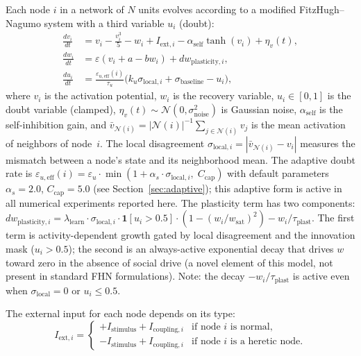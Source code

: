 \documentclass[11pt]{article}
\begin{document}
Each node $i$ in a network of $N$ units evolves according to a modified FitzHugh--Nagumo system with a third variable $u_i$ (doubt):
\begin{align}
\frac{dv_i}{dt} &= v_i - \frac{v_i^3}{5} - w_i + I_{\text{ext},i} - \alpha_{\text{self}} \tanh(v_i) + \eta_v(t), \label{eq:dv} \\
\frac{dw_i}{dt} &= \varepsilon(v_i + a - bw_i) + dw_{\text{plasticity},i}, \label{eq:dw} \\
\frac{du_i}{dt} &= \frac{\varepsilon_{u,\text{eff}}(i)}{\tau_u}\bigl(k_u \sigma_{\text{local},i} + \sigma_{\text{baseline}} - u_i\bigr), \label{eq:du}
\end{align}
where $v_i$ is the activation potential, $w_i$ is the recovery variable, $u_i \in [0, 1]$ is the doubt variable (clamped), $\eta_v(t) \sim \mathcal{N}(0, \sigma_{\text{noise}}^2)$ is Gaussian noise, $\alpha_{\text{self}}$ is the self-inhibition gain, and $\bar{v}_{\mathcal{N}(i)} = |\mathcal{N}(i)|^{-1} \sum_{j \in \mathcal{N}(i)} v_j$ is the mean activation of neighbors of node~$i$. The local disagreement $\sigma_{\text{local},i} = |\bar{v}_{\mathcal{N}(i)} - v_i|$ measures the mismatch between a node's state and its neighborhood mean. The adaptive doubt rate is $\varepsilon_{u,\text{eff}}(i) = \varepsilon_u \cdot \min(1 + \alpha_s \cdot \sigma_{\text{local},i},\; C_{\text{cap}})$ with default parameters $\alpha_s = 2.0$, $C_{\text{cap}} = 5.0$ (see Section~\ref{sec:adaptive}); this adaptive form is active in all numerical experiments reported here. The plasticity term has two components: $dw_{\text{plasticity},i} = \lambda_{\text{learn}} \cdot \sigma_{\text{local},i} \cdot \mathbf{1}[u_i > 0.5] \cdot (1 - (w_i/w_{\text{sat}})^2) - w_i/\tau_{\text{plast}}$. The first term is activity-dependent growth gated by local disagreement and the innovation mask ($u_i > 0.5$); the second is an always-active exponential decay that drives $w$ toward zero in the absence of social drive (a novel element of this model, not present in standard FHN formulations). Note: the decay $-w_i/\tau_{\text{plast}}$ is active even when $\sigma_{\text{local}} = 0$ or $u_i \leq 0.5$.

The external input for each node depends on its type:
\begin{equation}
I_{\text{ext},i} = \begin{cases}
+I_{\text{stimulus}} + I_{\text{coupling},i} & \text{if node } i \text{ is normal,} \\
-I_{\text{stimulus}} + I_{\text{coupling},i} & \text{if node } i \text{ is a heretic node.}
\end{cases}
\label{eq:stimulus}
\end{equation}
\end{document}
